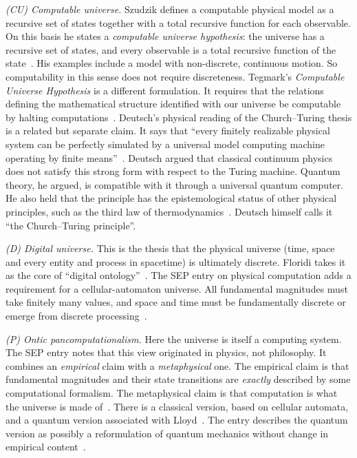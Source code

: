 \emph{(CU) Computable universe.} Szudzik defines a computable physical model as
a recursive set of states together with a total recursive function for each
observable. On this basis he states a \emph{computable universe hypothesis}:
the universe has a recursive set of states, and every observable is a total
recursive function of the state~\cite{Szudzik2012computable}. His examples
include a model with non-discrete, continuous motion. So computability in this
sense does not require discreteness. Tegmark's \emph{Computable Universe
Hypothesis} is a different formulation. It requires that the relations defining
the mathematical structure identified with our universe be computable by
halting computations~\cite{Tegmark2008mathematical}. Deutsch's physical
reading of the Church--Turing thesis is a related but separate claim. It says
that ``every finitely realizable physical system can be perfectly simulated by
a universal model computing machine operating by finite
means''~\cite{Deutsch1985quantum}. Deutsch argued that classical continuum
physics does not satisfy this strong form with respect to the Turing machine.
Quantum theory, he argued, is compatible with it through a universal quantum
computer. He also held that the principle has the epistemological status of
other physical principles, such as the third law of
thermodynamics~\cite{Deutsch1985quantum}. Deutsch himself calls it ``the
Church--Turing principle''.

\emph{(D) Digital universe.} This is the thesis that the physical universe
(time, space and every entity and process in spacetime) is ultimately discrete.
Floridi takes it as the core of ``digital ontology''~\cite{Floridi2009against}.
The SEP entry on physical computation adds a requirement for a
cellular-automaton universe. All fundamental magnitudes must take finitely many
values, and space and time must be fundamentally discrete or emerge from
discrete processing~\cite{Piccinini2025computation}.

\emph{(P) Ontic pancomputationalism.} Here the universe is itself a computing
system. The SEP entry notes that this view originated in physics, not
philosophy. It combines an \emph{empirical} claim with a \emph{metaphysical}
one. The empirical claim is that fundamental magnitudes and their state
transitions are \emph{exactly} described by some computational formalism. The
metaphysical claim is that computation is what the universe is made
of~\cite{Piccinini2025computation}. There is a classical version, based on
cellular automata, and a quantum version associated with
Lloyd~\cite{Lloyd2006programming}. The entry describes the quantum version as
possibly a reformulation of quantum mechanics without change in empirical
content~\cite{Piccinini2025computation}.

